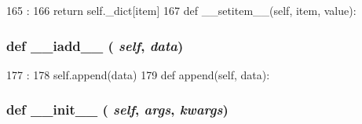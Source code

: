 \begin{DoxyCode}
165                                :
166         return self._dict[item]
167 
    def __setitem__(self, item, value):
\end{DoxyCode}
\hypertarget{classm5_1_1util_1_1code__formatter_1_1code__formatter_a2164b6b3eb98c2c9b8aab87e8d29dd51}{
\subsubsection[{\_\-\_\-iadd\_\-\_\-}]{\setlength{\rightskip}{0pt plus 5cm}def \_\-\_\-iadd\_\-\_\- ( {\em self}, \/   {\em data})}}
\label{classm5_1_1util_1_1code__formatter_1_1code__formatter_a2164b6b3eb98c2c9b8aab87e8d29dd51}



\begin{DoxyCode}
177                             :
178         self.append(data)
179 
    def append(self, data):
\end{DoxyCode}
\hypertarget{classm5_1_1util_1_1code__formatter_1_1code__formatter_ac775ee34451fdfa742b318538164070e}{
\subsubsection[{\_\-\_\-init\_\-\_\-}]{\setlength{\rightskip}{0pt plus 5cm}def \_\-\_\-init\_\-\_\- ( {\em self}, \/   {\em args}, \/   {\em kwargs})}}
\label{classm5_1_1util_1_1code__formatter_1_1code__formatter_ac775ee34451fdfa742b318538164070e}



